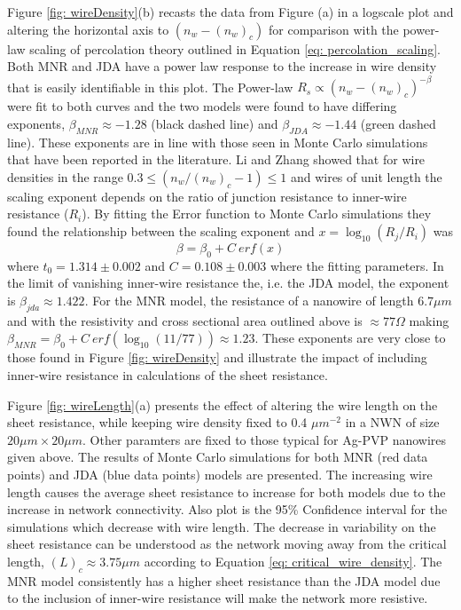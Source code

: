 Figure \ref{fig: wireDensity}(b) recasts the data from Figure (a) in a logscale plot and altering the horizontal axis to $(n_w - (n_w)_c)$ for comparison with the power-law scaling of percolation theory outlined in Equation \ref{eq: percolation_scaling}. Both MNR and JDA have a power law response to the increase in wire density that is easily identifiable in this plot. The Power-law $R_s \propto (n_w - (n_w)_c)^{-\beta}$ were fit to both curves and the two models were found to have differing exponents, $\beta_{MNR}\approx -1.28$ (black dashed line) and $\beta_{JDA}\approx -1.44$ (green dashed line). These exponents are in line with those seen in Monte Carlo simulations that have been reported in the literature. Li and Zhang showed that for wire densities in the range $0.3 \leq (n_w/(n_w)_c - 1) \leq 1$ and wires of unit length the scaling exponent depends on the ratio of junction resistance to inner-wire resistance ($R_i$). By fitting the Error function to Monte Carlo simulations they found the relationship between the scaling exponent and $x = \log_{10}(R_j/R_i)$ was 
\begin{equation}
\beta = \beta_0 + C~ erf(x)
\end{equation}
where $t_0 = 1.314 \pm 0.002$ and $C = 0.108 \pm 0.003$ where the fitting parameters. In the limit of vanishing inner-wire resistance the, i.e. the JDA model, the exponent is $\beta_{jda} \approx 1.422$. For the MNR model, the resistance of a nanowire of length $6.7 \mu m$ and with the resistivity and cross sectional area outlined above is $\approx 77 \Omega$ making $\beta_{MNR} = \beta_0 + C~erf( \log_{10}(11/77)) \approx 1.23$. These exponents are very close to those found in Figure \ref{fig: wireDensity} and illustrate the impact of including inner-wire resistance in calculations of the sheet resistance. 

Figure \ref{fig: wireLength}(a) presents the effect of altering the wire length on the sheet resistance, while keeping wire density fixed to 0.4 $\mu m^{-2}$ in a NWN of size $20 \mu m \times 20 \mu m$. Other paramters are fixed to those typical for Ag-PVP nanowires given above. The results of Monte Carlo simulations for both MNR (red data points) and JDA (blue data points) models are presented. The increasing wire length causes the average sheet resistance to increase for both models due to the increase in network connectivity. Also plot is the 95\% Confidence interval for the simulations which decrease with wire length. The decrease in variability on the sheet resistance can be understood as the network moving away from the critical length, $(L)_c \approx 3.75 \mu m$ according to Equation \ref{eq: critical_wire_density}. The MNR model consistently has a higher sheet resistance than the JDA model due to the inclusion of inner-wire resistance will make the network more resistive. 

